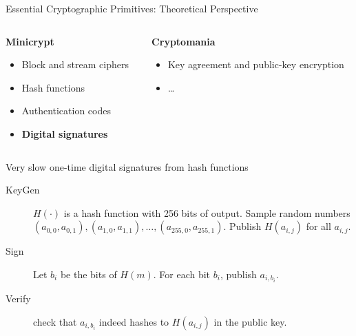\documentclass[xcolor=table,10pt,aspectratio=169]{beamer}
\begin{document}
\begin{frame}[label={sec:org5b25f09}]{Essential Cryptographic Primitives: Theoretical Perspective}
\begin{columns}[t]
\begin{column}{0.5\columnwidth}
\textbf{Minicrypt}

\small

\begin{itemize}
\item Block and stream ciphers
\item Hash functions
\item Authentication codes
\item \textbf{Digital signatures}
\end{itemize}
\end{column}

\begin{column}{0.5\columnwidth}
\textbf{Cryptomania}

\small

\begin{itemize}
\item Key agreement and public-key encryption
\item \ldots
\end{itemize}


\pause
\end{column}
\end{columns}

\begin{block}{Very slow one-time digital signatures from hash functions}
\begin{description}
\item[{KeyGen}] \(H(\cdot)\) is a hash function with 256 bits of output. Sample random numbers \((a_{0,0}, a_{0,1}), (a_{1,0}, a_{1,1}), \ldots, (a_{255,0}, a_{255,1})\). Publish \(H(a_{i,j})\) for all \(a_{i,j}\).
\item[{Sign}] Let \(b_i\) be the bits of \(H(m)\). For each bit \(b_i\), publish \(a_{i, b_i}\).
\item[{Verify}] check that \(a_{i, b_i}\) indeed hashes to \(H(a_{i,j})\) in the public key.
\end{description}
\end{block}
\end{frame}
\end{document}
